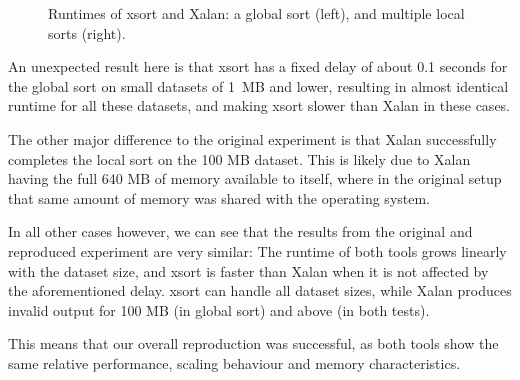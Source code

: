 \documentclass[sigconf,nonacm]{acmart}
\begin{document}
\begin{figure}[h]
    \hspace{-0.5cm}
    \begin{subfigure}{0.1\textwidth}
        \resizebox{!}{4cm}{}
    \end{subfigure}
    \hfill
    \begin{subfigure}{0.22\textwidth}
        \resizebox{!}{4cm}{}
    \end{subfigure}

    \caption{Runtimes of xsort and Xalan: a global sort (left), and multiple local sorts (right).}
    \label{fig:results}
\end{figure}

An unexpected result here is that xsort has a fixed delay of about 0.1 seconds for the global sort on small datasets of 1 MB and lower, resulting in almost identical runtime for all these datasets, and making xsort slower than Xalan in these cases.

The other major difference to the original experiment is that Xalan successfully completes the local sort on the 100 MB dataset. This is likely due to Xalan having the full 640 MB of memory available to itself, where in the original setup that same amount of memory was shared with the operating system.

In all other cases however, we can see that the results from the original and reproduced experiment are very similar: The runtime of both tools grows linearly with the dataset size, and xsort is faster than Xalan when it is not affected by the aforementioned delay. xsort can handle all dataset sizes, while Xalan produces invalid output for 100 MB (in global sort) and above (in both tests).

This means that our overall reproduction was successful, as both tools show the same relative performance, scaling behaviour and memory characteristics.




\end{document}
